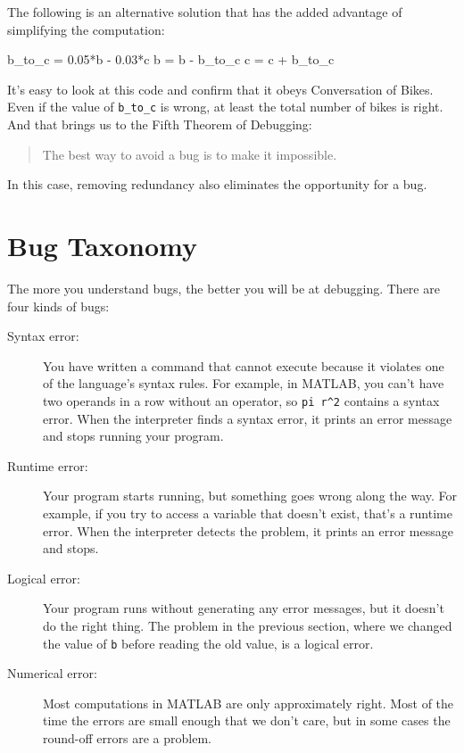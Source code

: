 
The following is an alternative solution that
has the added advantage of simplifying the computation:

\begin{code}
b_to_c = 0.05*b - 0.03*c
b = b - b_to_c
c = c + b_to_c
\end{code}

It's easy to look at this code and confirm that it obeys Conversation
of Bikes.  Even if the value of \verb"b_to_c" is wrong, at least the total
number of bikes is right.  And that brings us to the Fifth Theorem of
Debugging:

\begin{quote}
The best way to avoid a bug is to make it impossible.
\end{quote}

In this case, removing redundancy also eliminates the opportunity for a bug.

\section{Bug Taxonomy}

The more you understand bugs, the better you will be at debugging.
There are four kinds of bugs:


\begin{description}

\item[Syntax error:] You have written a command that cannot
execute because it violates one of the language's syntax rules.  For example, in MATLAB,
you can't have two operands in a row without an operator, so
\verb+pi r^2+ contains a syntax error.  When the interpreter finds a syntax
error, it prints an error message and stops running your program.

\item[Runtime error:] Your program starts running, but something goes
wrong along the way.  For example, if you try to access a variable
that doesn't exist, that's a runtime error.  When the interpreter detects the
problem, it prints an error message and stops.

\item[Logical error:] Your program runs without generating any error
messages, but it doesn't do the right thing.  The problem in the
previous section, where we changed the value of {\tt b} before
reading the old value, is a logical error.

\item[Numerical error:] Most computations in MATLAB are only
approximately right.  Most of the time the errors are small enough
that we don't care, but in some cases the round-off errors are a problem.

\end{description}

